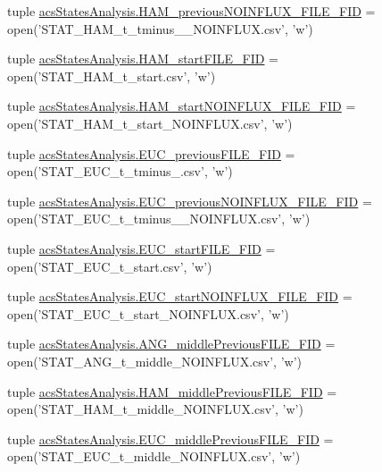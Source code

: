 \begin{DoxyCompactItemize}
tuple \hyperlink{a00104_a621d86851e86f9c83bb0add9ec741d7f}{acs\-States\-Analysis.\-H\-A\-M\-\_\-previous\-N\-O\-I\-N\-F\-L\-U\-X\-\_\-\-F\-I\-L\-E\-\_\-\-F\-I\-D} = open('S\-T\-A\-T\-\_\-\-H\-A\-M\-\_\-t\-\_\-tminus\-\_\-\_\-\-N\-O\-I\-N\-F\-L\-U\-X.\-csv', 'w')
\item 
tuple \hyperlink{a00104_abb14887e587e1107fc13046ad313077e}{acs\-States\-Analysis.\-H\-A\-M\-\_\-start\-F\-I\-L\-E\-\_\-\-F\-I\-D} = open('S\-T\-A\-T\-\_\-\-H\-A\-M\-\_\-t\-\_\-start.\-csv', 'w')
\item 
tuple \hyperlink{a00104_ab8a3b402c0b418cc290889a5f6482280}{acs\-States\-Analysis.\-H\-A\-M\-\_\-start\-N\-O\-I\-N\-F\-L\-U\-X\-\_\-\-F\-I\-L\-E\-\_\-\-F\-I\-D} = open('S\-T\-A\-T\-\_\-\-H\-A\-M\-\_\-t\-\_\-start\-\_\-\-N\-O\-I\-N\-F\-L\-U\-X.\-csv', 'w')
\item 
tuple \hyperlink{a00104_a3548edac9afffda077dcbd2876616b39}{acs\-States\-Analysis.\-E\-U\-C\-\_\-previous\-F\-I\-L\-E\-\_\-\-F\-I\-D} = open('S\-T\-A\-T\-\_\-\-E\-U\-C\-\_\-t\-\_\-tminus\-\_.\-csv', 'w')
\item 
tuple \hyperlink{a00104_aa2efc59329473a7bbeaf3ce32ec4dc3d}{acs\-States\-Analysis.\-E\-U\-C\-\_\-previous\-N\-O\-I\-N\-F\-L\-U\-X\-\_\-\-F\-I\-L\-E\-\_\-\-F\-I\-D} = open('S\-T\-A\-T\-\_\-\-E\-U\-C\-\_\-t\-\_\-tminus\-\_\-\_\-\-N\-O\-I\-N\-F\-L\-U\-X.\-csv', 'w')
\item 
tuple \hyperlink{a00104_a3d812ff298612e6aae54e7a9abfddbf2}{acs\-States\-Analysis.\-E\-U\-C\-\_\-start\-F\-I\-L\-E\-\_\-\-F\-I\-D} = open('S\-T\-A\-T\-\_\-\-E\-U\-C\-\_\-t\-\_\-start.\-csv', 'w')
\item 
tuple \hyperlink{a00104_a8ae5873fd9b162495a512e314047e930}{acs\-States\-Analysis.\-E\-U\-C\-\_\-start\-N\-O\-I\-N\-F\-L\-U\-X\-\_\-\-F\-I\-L\-E\-\_\-\-F\-I\-D} = open('S\-T\-A\-T\-\_\-\-E\-U\-C\-\_\-t\-\_\-start\-\_\-\-N\-O\-I\-N\-F\-L\-U\-X.\-csv', 'w')
\item 
tuple \hyperlink{a00104_aa5eb16eef2c90e2ccc991eb176280f21}{acs\-States\-Analysis.\-A\-N\-G\-\_\-middle\-Previous\-F\-I\-L\-E\-\_\-\-F\-I\-D} = open('S\-T\-A\-T\-\_\-\-A\-N\-G\-\_\-t\-\_\-middle\-\_\-\-N\-O\-I\-N\-F\-L\-U\-X.\-csv', 'w')
\item 
tuple \hyperlink{a00104_aaf0dd6e74d88a7cf2e909301b422c17d}{acs\-States\-Analysis.\-H\-A\-M\-\_\-middle\-Previous\-F\-I\-L\-E\-\_\-\-F\-I\-D} = open('S\-T\-A\-T\-\_\-\-H\-A\-M\-\_\-t\-\_\-middle\-\_\-\-N\-O\-I\-N\-F\-L\-U\-X.\-csv', 'w')
\item 
tuple \hyperlink{a00104_afcb9ec3ed11cfcacae8f796af7605425}{acs\-States\-Analysis.\-E\-U\-C\-\_\-middle\-Previous\-F\-I\-L\-E\-\_\-\-F\-I\-D} = open('S\-T\-A\-T\-\_\-\-E\-U\-C\-\_\-t\-\_\-middle\-\_\-\-N\-O\-I\-N\-F\-L\-U\-X.\-csv', 'w')

\end{DoxyCompactItemize}
